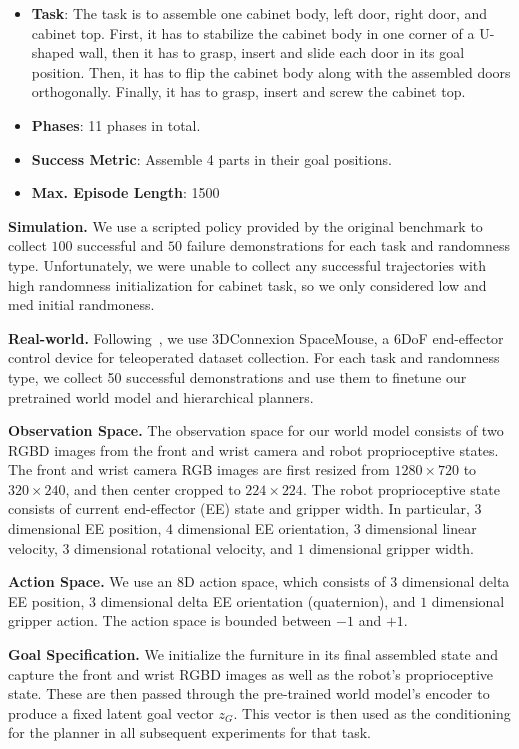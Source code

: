 \documentclass{article} %
\begin{document}
\begin{enumerate}
\begin{itemize}
        \item \textbf{Task}: The task is to assemble one cabinet body, left door, right door, and cabinet top. First, it has to stabilize the cabinet body in one corner of a U-shaped wall, then it has to grasp, insert and slide each door in its goal position. Then, it has to flip the cabinet body along with the assembled doors orthogonally. Finally, it has to grasp, insert and screw the cabinet top.
        \item \textbf{Phases}: 11 phases in total.
        \item \textbf{Success Metric}: Assemble 4 parts in their goal positions.
        \item \textbf{Max. Episode Length}: 1500
        \end{itemize}
\end{enumerate}

\textbf{Simulation.} We use a scripted policy provided by the original benchmark to collect $100$ successful and $50$ failure demonstrations for each task and randomness type. Unfortunately, we were unable to collect any successful trajectories with high randomness initialization for cabinet task, so we only considered low and med initial randmoness.

\textbf{Real-world.} Following~\citep{ankile2024juicer,ankile2024imitation,ren2024diffusion}, we use 3DConnexion SpaceMouse, a 6DoF end-effector control device for teleoperated dataset collection. For each task and randomness type, we collect 50 successful demonstrations and use them to finetune our pretrained world model and hierarchical planners.

\textbf{Observation Space.} The observation space for our world model consists of two RGBD images from the front and wrist camera and robot proprioceptive states. The front and wrist camera RGB images are first resized from $1280 \times 720$ to $320 \times 240$, and then center cropped to $224 \times 224$. The robot proprioceptive state consists of current end-effector (EE) state and gripper width. In particular, $3$ dimensional EE position, $4$ dimensional EE orientation, $3$ dimensional linear velocity, $3$ dimensional rotational velocity, and $1$ dimensional gripper width.

\textbf{Action Space.} We use an $8$D action space, which consists of $3$ dimensional delta EE position, $3$ dimensional delta EE orientation (quaternion), and $1$ dimensional gripper action. The action space is bounded between $-1$ and $+1$.

\textbf{Goal Specification.} We initialize the furniture in its final assembled state and capture the front and wrist RGBD images as well as the robot's proprioceptive state. These are then passed through the pre-trained world model's encoder to produce a fixed latent goal vector $z_G$. This vector is then used as the conditioning for the planner in all subsequent experiments for that task.
\end{document}
